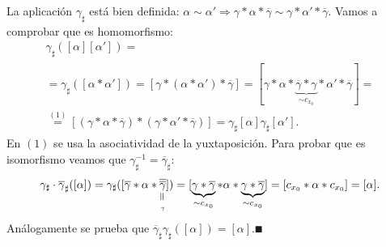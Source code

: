 \documentclass[GTS.tex]{subfiles}
\begin{document}
\begin{dem}
La aplicación $\gamma_\sharp$ está bien definida: $\alpha\sim\alpha'\Rightarrow\gamma*\alpha*\overline{\gamma}\sim\gamma*\alpha'*\overline{\gamma}$. Vamos a comprobar que es homomorfismo:
\begin{gather*}
\gamma_\sharp([\alpha][\alpha'])=\\
=\gamma_\sharp([\alpha*\alpha'])=[\gamma*(\alpha*\alpha')*\overline{\gamma}]=[\gamma*\alpha*\underbrace{\overline{\gamma}*\gamma}_{\sim c_{x_0}}*\alpha'*\overline{\gamma}]=\\
\overset{(1)}{=}[(\gamma*\alpha*\overline{\gamma})*(\gamma*\alpha'*\overline{\gamma})]
=\gamma_\sharp[\alpha]\gamma_\sharp[\alpha'].
\end{gather*}
En $(1)$ se usa la asociatividad de la yuxtaposición.
Para probar que es isomorfismo veamos que $\gamma^{-1}_\sharp=\overline{\gamma}_\sharp$:
\begin{gather*}
\gamma_\sharp\cdot\overline{\gamma}_\sharp([\alpha])=\gamma_\sharp([\overline{\gamma}*\alpha*\underset{\underset{\gamma}{\verteq}}{\overline{\overline{\gamma}}}])=[\underbrace{\gamma*\overline{\gamma}}_{\sim c_{x_0}}*\alpha*\underbrace{\gamma*\overline{\gamma}}_{\sim c_{x_0}}]=[c_{x_0}*\alpha*c_{x_0}]=[\alpha].
\end{gather*}
Análogamente se prueba que $\overline{\gamma}_\sharp\gamma_\sharp([\alpha])=[\alpha]$.$\QED$
\end{dem}
\end{document}
